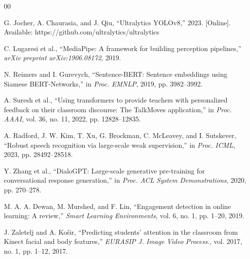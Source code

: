 \documentclass[conference]{IEEEtran}
\begin{document}
\begin{thebibliography}{00}

 G. Jocher, A. Chaurasia, and J. Qiu, ``Ultralytics YOLOv8,'' 2023. [Online]. Available: https://github.com/ultralytics/ultralytics

 C. Lugaresi et al., ``MediaPipe: A framework for building perception pipelines,'' \emph{arXiv preprint arXiv:1906.08172}, 2019.

 N. Reimers and I. Gurevych, ``Sentence-BERT: Sentence embeddings using Siamese BERT-Networks,'' in \emph{Proc. EMNLP}, 2019, pp. 3982--3992.

 A. Suresh et al., ``Using transformers to provide teachers with personalized feedback on their classroom discourse: The TalkMoves application,'' in \emph{Proc. AAAI}, vol. 36, no. 11, 2022, pp. 12828--12835.

 A. Radford, J. W. Kim, T. Xu, G. Brockman, C. McLeavey, and I. Sutskever, ``Robust speech recognition via large-scale weak supervision,'' in \emph{Proc. ICML}, 2023, pp. 28492--28518.

 Y. Zhang et al., ``DialoGPT: Large-scale generative pre-training for conversational response generation,'' in \emph{Proc. ACL System Demonstrations}, 2020, pp. 270--278.

 M. A. A. Dewan, M. Murshed, and F. Lin, ``Engagement detection in online learning: A review,'' \emph{Smart Learning Environments}, vol. 6, no. 1, pp. 1--20, 2019.

 J. Zaletelj and A. Ko\v{s}ir, ``Predicting students' attention in the classroom from Kinect facial and body features,'' \emph{EURASIP J. Image Video Process.}, vol. 2017, no. 1, pp. 1--12, 2017.

\end{thebibliography}
\end{document}
